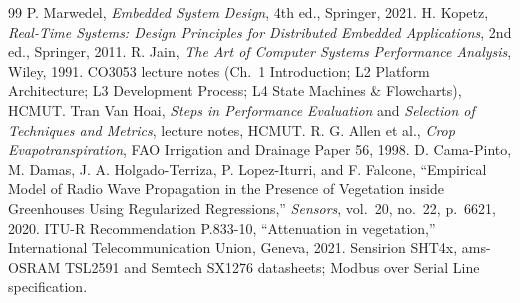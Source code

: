 \documentclass[11pt,a4paper]{report}
\begin{document}
\begin{thebibliography}{99}
 P. Marwedel, \emph{Embedded System Design}, 4th ed., Springer, 2021.
 H. Kopetz, \emph{Real-Time Systems: Design Principles for Distributed Embedded Applications}, 2nd ed., Springer, 2011.
 R. Jain, \emph{The Art of Computer Systems Performance Analysis}, Wiley, 1991.
 CO3053 lecture notes (Ch.~1 Introduction; L2 Platform Architecture; L3 Development Process; L4 State Machines \& Flowcharts), HCMUT.
 Tran Van Hoai, \emph{Steps in Performance Evaluation} and \emph{Selection of Techniques and Metrics}, lecture notes, HCMUT.
 R. G. Allen et al., \emph{Crop Evapotranspiration}, FAO Irrigation and Drainage Paper 56, 1998.
 D. Cama-Pinto, M. Damas, J. A. Holgado-Terriza, P. Lopez-Iturri, and F. Falcone, ``Empirical Model of Radio Wave Propagation in the Presence of Vegetation inside Greenhouses Using Regularized Regressions,'' \emph{Sensors}, vol.~20, no.~22, p.~6621, 2020.
 ITU-R Recommendation P.833-10, ``Attenuation in vegetation,'' International Telecommunication Union, Geneva, 2021.
 Sensirion SHT4x, ams-OSRAM TSL2591 and Semtech SX1276 datasheets; Modbus over Serial Line specification.
\end{thebibliography}
\end{document}
